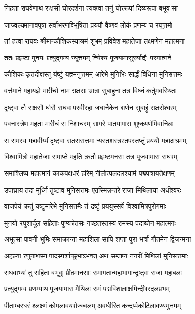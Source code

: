 \twolineshloka
{निहता राघवेणाथ राक्षसी घोरदर्शना}
{त्यक्त्वा तनुं घोररूपां दिव्यरूपा बभूव सा}%

\twolineshloka
{जाज्वल्यमानावपुषा सर्वाभरणविभूषिता}
{प्रययौ वैष्णवं लोकं प्रणम्य च रघूत्तमौ}%

\twolineshloka
{तां हत्वा राघवः श्रीमान्कौशिकस्याश्रमं शुभम्}
{प्रविवेश महातेजा लक्ष्मणेन महात्मना}%

\twolineshloka
{ततः प्रहृष्टा मुनयः प्रत्युद्गम्य रघूत्तमम्}
{निवेश्य पूजयामासुरर्घाद्यैः परमात्मने}%

\twolineshloka
{कौशिकः कृतदीक्षस्तु यंष्टुं यज्ञमनुत्तमम्}
{आरेभे मुनिभिः सार्द्धं विधिना मुनिसत्तमः}%

\twolineshloka
{वर्त्तमाने महायज्ञे मारीचो नाम राक्षसः}
{भ्रात्रा सुबाहुना तत्र विघ्नं कर्तुमवस्थितः}%

\twolineshloka
{दृष्ट्वा तौ राक्षसौ घोरौ राघवः परवीरहा}
{जघानैकेन बाणेन सुबाहुं राक्षसेश्वरम्}%

\twolineshloka
{पवनास्त्रेण महता मारीचं स निशाचरम्}
{सागरे पातयामास शुष्कपर्णमिवानिलः}%

\twolineshloka
{स रामस्य महावीर्य्यं दृष्ट्वा राक्षससत्तमः}
{न्यस्तशस्त्रस्तपस्तप्तुं प्रययौ महादाश्रमम्}%

\twolineshloka
{विश्वामित्रो महातेजाः समाप्ते महति क्रतौ}
{प्रहृष्टमनसा तत्र पूजयामास राघवम्}%

\twolineshloka
{समाश्लिष्य महात्मानं काकपक्षधरं हरिम्}
{नीलोत्पलदलश्यामं पद्मपत्रायतेक्षणम्}%

\twolineshloka
{उपाघ्राय तदा मूर्ध्नि तुष्टाव मुनिसत्तमः}
{एतस्मिन्नन्तरे राजा मिथिलाया अधीश्वरः}%

\twolineshloka
{वाजपेयं क्रतुं यष्टुमारेभे मुनिसत्तमैः}
{तं द्रष्टुं प्रययुस्सर्वे विश्वामित्रपुरोगमाः}%

\twolineshloka
{मुनयो रघुशार्दूल सहिताः पुण्यचेतसः}
{गच्छतस्तस्य रामस्य पदाब्जेन महात्मनः}%

\twolineshloka
{अभूत्सा पावनी भूमिः समाक्रान्ता महाशिला}
{सापि शप्ता पुरा भर्त्रा गौतमेन द्विजन्मना}%

\twolineshloka
{अहल्या रघुनाथस्य पादस्पर्शाच्छुभाऽभवत्}
{अथ सम्प्राप्य नगरीं मिथिलां मुनिसत्तमाः}%

\twolineshloka
{राघवाभ्यां तु सहिता बभूवुः प्रीतमानसाः}
{समागतान्महाभागान्दृष्ट्वा राजा महाबलः}%

\twolineshloka
{प्रत्युद्गम्य प्रणम्याथ पूजयामास मैथिलः}
{रामं पद्मविशालाक्षमिन्दीवरदलप्रभम्}%

\twolineshloka
{पीताम्बरधरं श्लक्ष्णं कोमलावयवोज्ज्वलम्}
{अवधीरित कन्दर्प्पकोटिलावण्यमुत्तमम्}%

